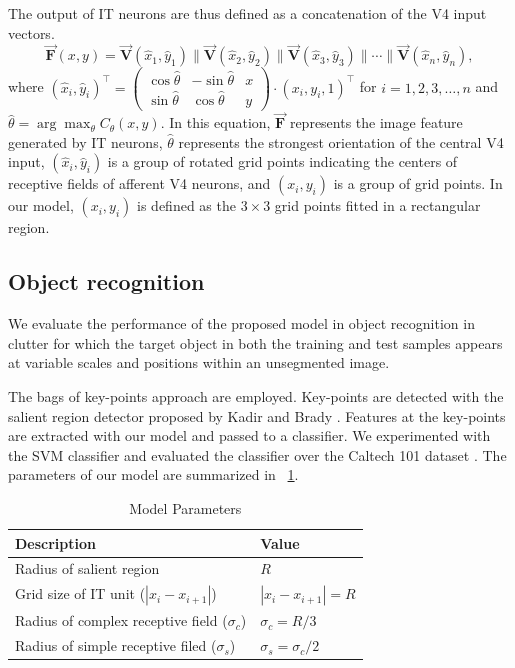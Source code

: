 \documentclass[5p]{elsarticle}
\begin{document}
The output of IT neurons are thus defined as a concatenation of the V4 input vectors.
\begin{equation}
\mathbf{\vec{F}}(x,y) = \mathbf{\vec{V}}(\hat{x}_1,\hat{y}_1)\|
\mathbf{\vec{V}}(\hat{x}_2,\hat{y}_2)\|
\mathbf{\vec{V}}(\hat{x}_3,\hat{y}_3)\|{}  \cdots\|
\mathbf{\vec{V}}(\hat{x}_n,\hat{y}_n),
\end{equation}
where $(\hat{x}_i,\hat{y}_i)^{\top} = 
\left(\begin{array}{ccc}
\cos\hat\theta & -\sin\hat\theta & x \\
\sin\hat\theta & \cos\hat\theta & y
\end{array}\right)\cdot(x_i,y_i,1)^{\top}$ for $i=1,2,3,\dots,n$ and 
$\hat\theta = \arg\!\max_\theta C_\theta(x,y)$.
In this equation, $\mathbf{\vec{F}}$ represents the image feature generated by IT neurons, 
$\hat\theta$ represents the strongest orientation of the central V4 input, 
$(\hat{x}_i,\hat{y}_i)$ is a group of rotated grid points
indicating the centers of receptive fields of afferent V4 neurons, 
and $(x_i,y_i)$ is a group of grid points.
In our model, $(x_i,y_i)$ is defined as the $3\times 3$ grid points fitted 
in a rectangular region.



\subsection{Object recognition}\label{sec:exp:objectrecognition}

We evaluate the performance of the proposed model
in object recognition in clutter for which 
the target object in both the training and test samples
appears at variable scales and positions 
within an unsegmented image.

The bags of key-points approach \cite{Csurka2004} are employed.
Key-points are detected with the salient region detector 
proposed by Kadir and Brady \cite{Kadir2001}.
Features at the key-points are extracted with our model
and passed to a classifier.
We experimented with the SVM classifier
and evaluated the classifier over the Caltech 101 dataset \cite{Fei-Fei2004}.
The parameters of our model are summarized in \tablename~\ref{tab:param}.

\begin{table}
\caption{Model Parameters}
\label{tab:param}
\begin{center}
\begin{tabular}{ll}
\hline
{\bf Description} &{\bf Value}\\ 
\hline
Radius of salient region & $R$ \\
Grid size of IT unit ($|x_{i}-x_{i+1}|$) & $|x_{i}-x_{i+1}|=R$ \\
Radius of complex receptive field ($\sigma_c$) & $\sigma_c=R/3$ \\
Radius of simple receptive filed ($\sigma_s$) & $\sigma_s=\sigma_c/2$ \\
\hline
\end{tabular}
\end{center}
\end{table}
\end{document}
